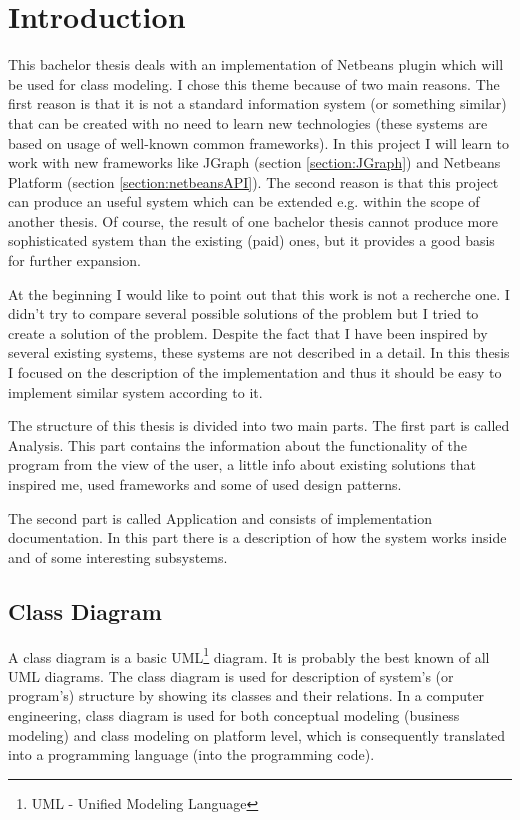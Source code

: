 \chapter{Introduction}

This bachelor thesis deals with an implementation of Netbeans plugin which will be used for class modeling. I chose this theme because of two main reasons. The first reason is that it is not a standard information system (or something similar) that can be created with no need to learn new technologies (these systems are based on usage of well-known common frameworks). In this project I will learn to work with new frameworks like JGraph (section \ref{section:JGraph}) and Netbeans Platform (section \ref{section:netbeansAPI}). The second reason is that this project can produce an useful system which can be extended e.g. within the scope of another thesis. Of course, the result of one bachelor thesis cannot produce more sophisticated system than the existing (paid) ones, but it provides a good basis for further expansion. 

At the beginning I would like to point out that this work is not a recherche one. I didn't try to compare several possible solutions of the problem but I tried to create a solution of the problem. Despite the fact that I have been inspired by several existing systems, these systems are not described in a detail. In this thesis I focused on the description of the implementation and thus it should be easy to implement similar system according to it.

The structure of this thesis is divided into two main parts. The first part is called Analysis. This part contains the information about the functionality of the program from the view of the user, a little info about existing solutions that inspired me, used frameworks and some of used design patterns.

The second part is called Application and consists of implementation documentation. In this part there is a description of how the system works inside and of some interesting subsystems.

\section{Class Diagram}
\label{section:classDiagramDescription}

A class diagram is a basic UML\footnote{UML - Unified Modeling Language} diagram. It is probably the best known of all UML diagrams. The class diagram is used for description of system's (or program's) structure by showing its classes and their relations. In a computer engineering, class diagram is used for both conceptual modeling (business modeling) and class modeling on platform level, which is consequently translated into a programming language (into the programming code).

